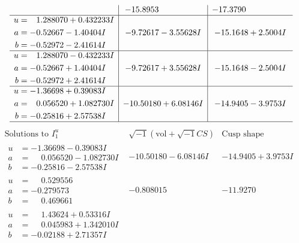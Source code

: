 \documentclass[1p]{elsarticle_modified}
\theoremstyle{definition}
\newcommand{\I}{\sqrt{-1}}
\begin{document}
$$\begin{array}{c|c|c}
 & -15.8953\phantom{ +0.000000I} & -17.3790\phantom{ +0.000000I} \\ \hline\begin{aligned}
u &= \phantom{-}1.288070 + 0.432233 I \\
a &= -0.52667 - 1.40404 I \\
b &= -0.52972 - 2.41614 I\end{aligned}
 & -9.72617 - 3.55628 I & -15.1648 + 2.5004 I \\ \hline\begin{aligned}
u &= \phantom{-}1.288070 - 0.432233 I \\
a &= -0.52667 + 1.40404 I \\
b &= -0.52972 + 2.41614 I\end{aligned}
 & -9.72617 + 3.55628 I & -15.1648 - 2.5004 I \\ \hline\begin{aligned}
u &= -1.36698 + 0.39083 I \\
a &= \phantom{-}0.056520 + 1.082730 I \\
b &= -0.25816 + 2.57538 I\end{aligned}
 & -10.50180 + 6.08146 I & -14.9405 - 3.9753 I\\
 \hline 
 \end{array}$$\newpage$$\begin{array}{c|c|c}  
\text{Solutions to }I^u_{1}& \I (\text{vol} + \sqrt{-1}CS) & \text{Cusp shape}\\
 \hline 
\begin{aligned}
u &= -1.36698 - 0.39083 I \\
a &= \phantom{-}0.056520 - 1.082730 I \\
b &= -0.25816 - 2.57538 I\end{aligned}
 & -10.50180 - 6.08146 I & -14.9405 + 3.9753 I \\ \hline\begin{aligned}
u &= \phantom{-}0.529556\phantom{ +0.000000I} \\
a &= -0.279573\phantom{ +0.000000I} \\
b &= \phantom{-}0.469661\phantom{ +0.000000I}\end{aligned}
 & -0.808015\phantom{ +0.000000I} & -11.9270\phantom{ +0.000000I} \\ \hline\begin{aligned}
u &= \phantom{-}1.43624 + 0.53316 I \\
a &= \phantom{-}0.045983 + 1.342010 I \\
b &= -0.02188 + 2.71357 I\end{aligned}

\end{array}$$
\end{document}
